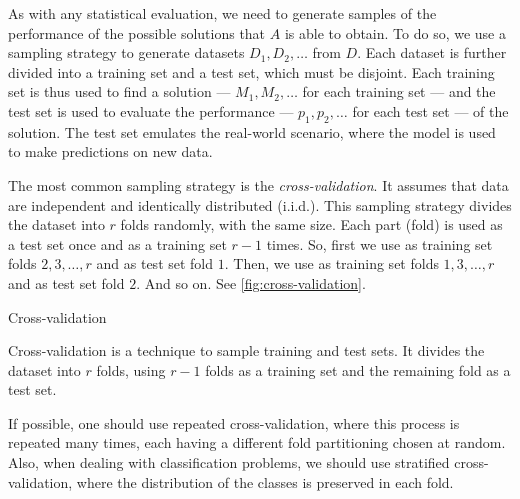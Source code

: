 As with any statistical evaluation, we need to generate samples
of the performance of the possible solutions that $A$ is able to obtain. To do so, we use
a sampling strategy to generate datasets $D_1, D_2, \ldots$ from $D$.  Each
dataset is further divided into a training set and a test set, which must be disjoint.
Each training set is thus used to find a solution --- $M_1, M_2, \ldots$ for each
training set --- and the test set is used to evaluate the performance --- $p_1, p_2,
\ldots$ for each test set --- of the solution.  The test set emulates the real-world
scenario, where the model is used to make predictions on new data.

The most common sampling strategy is the \emph{cross-validation}.  It assumes that data are
independent and identically distributed (i.i.d.).  This sampling strategy divides
the dataset into $r$ folds randomly, with the same size.  Each part (fold) is used as a
test set once and as a training set $r-1$ times.  So, first we use as training set folds
$2, 3, \ldots, r$ and as test set fold $1$.  Then, we use as training set folds $1, 3,
\ldots, r$ and as test set fold $2$. And so on.  See \cref{fig:cross-validation}.

\begin{figurebox}[label=fig:cross-validation]{Cross-validation}
  \centering
  \tcblower
  Cross-validation is a technique to sample training and test sets.  It divides the
  dataset into $r$ folds, using $r-1$ folds as a training set and the remaining fold as a
  test set.
\end{figurebox}

If possible, one should use repeated cross-validation, where this process is repeated many
times, each having a different fold partitioning chosen at random.  Also, when dealing with
classification problems, we should use stratified cross-validation, where the distribution
of the classes is preserved in each fold.

